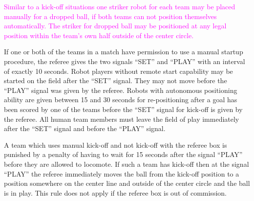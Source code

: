 \textcolor{magenta}{Similar to a kick-off situations one striker robot for each team may be placed manually for a dropped ball, if both teams can not position themselves automatically. The striker for dropped ball may be positioned at any legal position within the team's own half outside of the center circle.}

\bigskip

If one or both of the teams in a match have permission to use a manual startup procedure, the referee gives the two signals ``SET'' and ``PLAY'' with an interval of exactly
10 seconds. Robot players without remote start capability may be started on the field after the ``SET'' signal. They may not move before the ``PLAY'' signal was given
by the referee. Robots with autonomous positioning ability are given between 15 and 30 seconds for re-positioning after a goal has been scored by one of the teams before the ``SET'' signal for kick-off is given by the referee. All human team members must leave the field of play
immediately after the ``SET'' signal and before the ``PLAY'' signal.

A team which uses manual kick-off and not kick-off with the referee box is punished by a penalty of having to wait for 15 seconds after the signal ``PLAY'' before they are
allowed to locomote. If such a team has kick-off then at the signal ``PLAY'' the referee immediately moves the ball from the kick-off position to a position somewhere on
the center line and outside of the center circle and the ball is in play. This rule does not apply if the referee box is out of commission.

\bigskip

